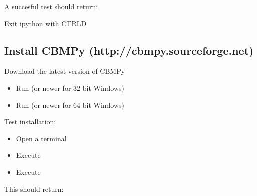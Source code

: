 \documentclass[letterpaper,10pt,english]{sphinxmanual}
\begin{document}
\sphinxAtStartPar
A succesful test should return:

\begin{sphinxVerbatim}[commandchars=\\\{\}]
  
   
\end{sphinxVerbatim}

\sphinxAtStartPar
Exit ipython with CTRL\sphinxhyphen{}D


\subsection{Install CBMPy (http://cbmpy.sourceforge.net)}
\label{\detokenize{install_doc:install-cbmpy-http-cbmpy-sourceforge-net}}
\sphinxAtStartPar
Download the latest version of CBMPy
\begin{itemize}
\item {} 
\sphinxAtStartPar
Run  (or newer for 32 bit Windows)

\item {} 
\sphinxAtStartPar
Run  (or newer for 64 bit Windows)

\end{itemize}

\sphinxAtStartPar
Test installation:
\begin{itemize}
\item {} 
\sphinxAtStartPar
Open a terminal

\item {} 
\sphinxAtStartPar
Execute 

\item {} 
\sphinxAtStartPar
Execute 

\end{itemize}

\sphinxAtStartPar
This should return:
\end{document}
